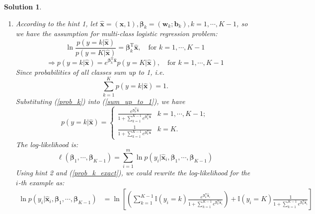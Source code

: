 \documentclass[a4paper,UTF8]{article}
\numberwithin{equation}{section}
\newtheorem*{solution}{Solution}
\begin{document}
\begin{solution}
\begin{enumerate}[(1)]
	\item According to the hint 1, let $\hat{\mathbf{x}} = (\mathbf{x}, 1), \bm{\beta}_k = (\mathbf{w}_k; \mathbf{b}_k), k=1,\cdots, K-1$, so we have the assumption for multi-class logistic regression problem:
	\begin{equation*}
\ln\frac{p(y=k|\hat{\mathbf{x}})}{p(y=K|\hat{\mathbf{x}})} =\bm{\beta}_k^\mathrm{T}\hat{\mathbf{x}}, \quad \text{for } k =1, \cdots, K-1
\end{equation*}
\begin{equation}\label{prob_k}
\Rightarrow p(y=k|\hat{\mathbf{x}}) = e^{\bm{\beta}_k^\mathrm{T}\hat{\mathbf{x}}} p(y=K|\hat{\mathbf{x}}),  \quad \text{for } k =1, \cdots, K-1
\end{equation}
Since probabilities of all classes sum up to 1, i.e.
\begin{equation}\label{sum_up_to_1}
\sum_{k=1}^K p(y=k|\hat{\mathbf{x}}) = 1.
\end{equation}
Substituting (\ref{prob_k}) into (\ref{sum_up_to_1}), we have
\begin{equation}\label{prob_k_exact}
	p(y=k|\hat{\mathbf{x}}) = 
	\begin{cases}
		\frac{e^{\bm{\beta}_k^\mathrm{T}\hat{\mathbf{x}}}}{1+ \sum_{k=1}^{K-1} e^{\bm{\beta}_k^\mathrm{T}\hat{\mathbf{x}}}} & k=1, \cdots, K-1;\\
		\frac{1}{1+ \sum_{k=1}^{K-1} e^{\bm{\beta}_k^\mathrm{T}\hat{\mathbf{x}}}} & k=K.
	\end{cases}
\end{equation}
The log-likelihood is:
\begin{equation}\label{original-loglikelihood}
\ell(\bm{\beta}_1, \cdots, \bm{\beta}_{K-1}) = \sum_{i=1}^m \ln p(y_i |\hat{\mathbf{x}}_i, \bm{\beta}_1, \cdots, \bm{\beta}_{K-1})
\end{equation}
Using hint 2 and (\ref{prob_k_exact}), we could rewrite the log-likelihood for the $i$-th example as:
\begin{equation}\label{item-likelihood}
\begin{split}
\ln  p(y_i |\hat{\mathbf{x}}_i, \bm{\beta}_1, \cdots, \bm{\beta}_{K-1})  &= 
\ln [ (\sum_{k=1}^{K-1} \mathbb{I}(y_i=k) \frac{e^{\bm{\beta}_k^\mathrm{T}\hat{\mathbf{x}}_i}}{1+ \sum_{k=1}^{K-1} e^{\bm{\beta}_k^\mathrm{T}\hat{\mathbf{x}}_i}}) + \mathbb{I}(y_i=K)\frac{1}{1+ \sum_{k=1}^{K-1} e^{\bm{\beta}_k^\mathrm{T}\hat{\mathbf{x}}_i}} ] \\

\end{split}
\end{equation}
\end{enumerate}
\end{solution}
\end{document}
